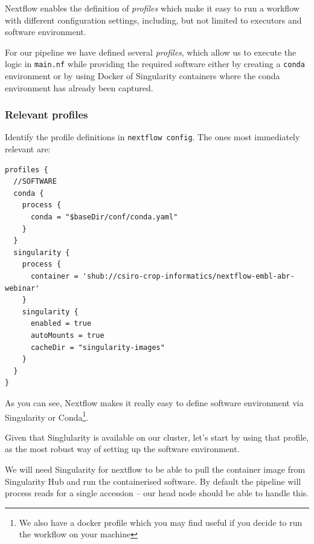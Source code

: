 Nextflow enables the definition of \emph{profiles} which make it easy to run a workflow 
with different configuration settings, including, but not limited to executors and software environment.

For our pipeline we have defined several \emph{profiles}, which allow us to execute the logic in \texttt{main.nf} while providing the required software either by creating a \texttt{conda} environment or by using Docker of Singularity containers where the conda environment has already been captured. 

\subsubsection{Relevant profiles}


Identify the profile definitions in \texttt{nextflow config}. The ones most immediately relevant are:
\begin{lstlisting}
profiles {
  //SOFTWARE
  conda {
    process {
      conda = "$baseDir/conf/conda.yaml"
    }
  }
  singularity {
    process {
      container = 'shub://csiro-crop-informatics/nextflow-embl-abr-webinar' 
    }
    singularity {
      enabled = true
      autoMounts = true
      cacheDir = "singularity-images"  
    }
  }
}
\end{lstlisting}



As you can see, Nextflow makes it really easy to %
define software environment via Singularity or Conda\footnote{We also have a docker profile which you may find useful if you decide to run the workflow on your machine}. 

%



Given that Singlularity is available on our cluster, let's start by using that profile,
as the most robust way of setting up the software environment.



We will need Singularity for nextflow to be able to pull the container image from Singularity Hub and run the containerised software. 
By default the pipeline will process reads for a single accession -- our head node should be able to handle this. 


